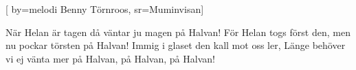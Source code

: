 [
	by={melodi Benny Törnroos},					
	sr={Muminvisan}]					
	
\beginverse*
När Helan är tagen
då väntar ju magen på Halvan!
För Helan togs först den,
men nu pockar törsten på Halvan!
Immig i glaset den kall mot oss ler,
Länge behöver vi ej vänta mer
på Halvan, på Halvan, på Halvan!
\endverse									
\endsong							
